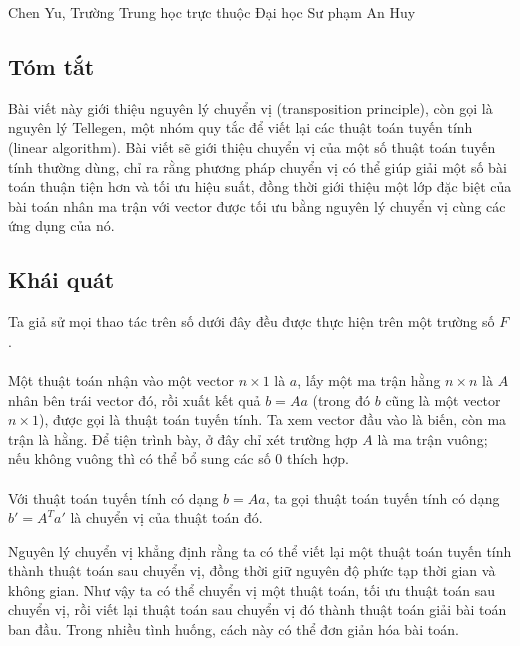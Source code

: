 \documentclass[11pt]{article}
\begin{document}
\begin{center}
Chen Yu, Trường Trung học trực thuộc Đại học Sư phạm An Huy
\end{center}

\subsection*{Tóm tắt}

Bài viết này giới thiệu nguyên lý chuyển vị (transposition principle), còn gọi
là nguyên lý Tellegen, một nhóm quy tắc để viết lại các thuật toán tuyến tính
(linear algorithm). Bài viết sẽ giới thiệu chuyển vị của một số thuật toán
tuyến tính thường dùng, chỉ ra rằng phương pháp chuyển vị có thể giúp giải một
số bài toán thuận tiện hơn và tối ưu hiệu suất, đồng thời giới thiệu một lớp
đặc biệt của bài toán nhân ma trận với vector được tối ưu bằng nguyên lý chuyển
vị cùng các ứng dụng của nó.

\subsection{Khái quát}

Ta giả sử mọi thao tác trên số dưới đây đều được thực hiện trên một trường số
\(F\).

\paragraph{}
Một thuật toán nhận vào một vector \(n\times 1\) là \(a\), lấy một ma trận hằng
\(n\times n\) là \(A\) nhân bên trái vector đó, rồi xuất kết quả \(b=Aa\) (trong
đó \(b\) cũng là một vector \(n\times 1\)), được gọi là thuật toán tuyến tính.
Ta xem vector đầu vào là biến, còn ma trận là hằng. Để tiện trình bày, ở đây
chỉ xét trường hợp \(A\) là ma trận vuông; nếu không vuông thì có thể bổ sung
các số \(0\) thích hợp.

\paragraph{}
Với thuật toán tuyến tính có dạng \(b=Aa\), ta gọi thuật toán tuyến tính có dạng
\(b'=A^Ta'\) là chuyển vị của thuật toán đó.

Nguyên lý chuyển vị khẳng định rằng ta có thể viết lại một thuật toán tuyến tính
thành thuật toán sau chuyển vị, đồng thời giữ nguyên độ phức tạp thời gian và
không gian. Như vậy ta có thể chuyển vị một thuật toán, tối ưu thuật toán sau
chuyển vị, rồi viết lại thuật toán sau chuyển vị đó thành thuật toán giải bài
toán ban đầu. Trong nhiều tình huống, cách này có thể đơn giản hóa bài toán.
\end{document}
